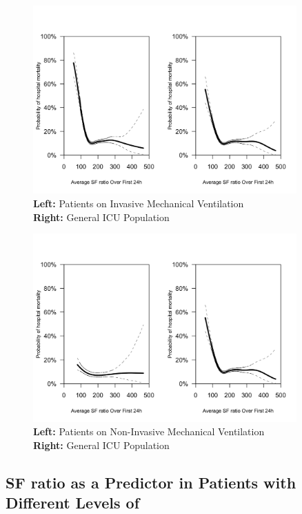 \begin{figure}[H]
	\centering
	\includegraphics[width=0.9\textwidth]{figures/subgroupanalysis1-2.png}
	\caption{\textbf{Left:} Patients on Invasive Mechanical Ventilation \\ \textbf{Right:} General ICU Population}
	\label{fig:subgroupanalysis1-2}
\end{figure}


\begin{figure}[H]
	\centering
	\includegraphics[width=0.9\textwidth]{figures/subgroupanalysis1-1.png}
	\caption{\textbf{Left:} Patients on Non-Invasive Mechanical Ventilation \\ \textbf{Right:} General ICU Population}
	\label{fig:subgroupanalysis1-1}
\end{figure}



\subsection{SF ratio as a Predictor in Patients with Different Levels of \Fi}

